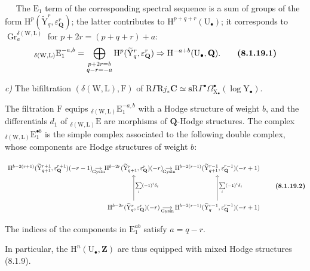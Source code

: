 \documentclass[11pt,leqno]{article}
\newcommand{\Page}[1]{\ifvmode\noindent\else\unskip\ \fi{\footnotesize\textcolor{gray}{[p.\,#1]}}\ \ignorespaces}
\begin{document}
\Page{35}
The \(\mathrm{E}_{1}\) term of the corresponding spectral sequence is a sum of groups of the form \(\mathrm{H}^{p}(\widetilde{\mathrm{Y}}_{q}^{r},\varepsilon_{\mathbf{Q}}^{r})\); the latter contributes to \(\mathrm{H}^{p+q+r}(\mathrm{U}_{\bullet})\); it corresponds to \(\operatorname{Gr}_{a}^{\delta(\mathrm{W},\mathrm{L})}\) for \(p+2r=(p+q+r)+a\):
\[
{}_{\delta(\mathrm{W},\mathrm{L})}\mathrm{E}_{1}^{-a,b}
=
\bigoplus_{\substack{p+2r=b\\q-r=-a}}
\mathrm{H}^{p}(\widetilde{\mathrm{Y}}_{q}^{r},\varepsilon_{\mathbf{Q}}^{r})
\Rightarrow
\mathrm{H}^{-a+b}(\mathrm{U}_{\bullet},\mathbf{Q}).
\tag*{\textbf{(8.1.19.1)}}
\]

\textit{c)} The bifiltration \((\delta(\mathrm{W},\mathrm{L}),\mathrm{F})\) of \(\mathrm{R}\Gamma\mathrm{R}j_{\ast}\mathbf{C}\simeq\mathbf{s}\mathrm{R}\Gamma^\bullet\Omega_{\mathrm{X}_{\bullet}}^\bullet(\log\mathrm{Y}_{\bullet})\).

The filtration \(\mathrm{F}\) equips \({}_{\delta(\mathrm{W},\mathrm{L})}\mathrm{E}_{1}^{-a,b}\) with a Hodge structure of weight \(b\), and the differentials \(d_{1}\) of \({}_{\delta(\mathrm{W},\mathrm{L})}\mathrm{E}\) are morphisms of \(\mathbf{Q}\)-Hodge structures. The complex \({}_{\delta(\mathrm{W},\mathrm{L})}\mathrm{E}_{1}^{\bullet b}\) is the simple complex associated to the following double complex, whose components are Hodge structures of weight \(b\):

{\small
\[
\begin{tikzcd}[ampersand replacement=\&, column sep=1em, row sep=4em]
\mathrm{H}^{b-2(r+1)}
(\widetilde{\mathrm{Y}}_{q+1}^{r+1},\varepsilon_{\mathbf{Q}}^{r+1})(-r-1)
\arrow[r, "\mathrm{Gysin}"']
\&
\mathrm{H}^{b-2r}
(\widetilde{\mathrm{Y}}_{q+1}^{r},\varepsilon_{\mathbf{Q}}^{r})(-r)
\arrow[r, "\mathrm{Gysin}"']
\&
\mathrm{H}^{b-2(r-1)}
(\widetilde{\mathrm{Y}}_{q+1}^{r-1},\varepsilon_{\mathbf{Q}}^{r-1})(-r+1)
\\
\&
\mathrm{H}^{b-2r}
(\widetilde{\mathrm{Y}}_{q}^{r},\varepsilon_{\mathbf{Q}}^{r})(-r)
\arrow[u, "{\sum\limits_i(-1)^i\delta_i}"']
\arrow[r, "\mathrm{Gysin}"']
\&
\mathrm{H}^{b-2(r-1)}
(\widetilde{\mathrm{Y}}_{q}^{r-1},\varepsilon_{\mathbf{Q}}^{r-1})(-r+1)
\arrow[u, "{\sum\limits_i(-1)^i\delta_i}"']
\end{tikzcd}
\tag*{\textbf{(8.1.19.2)}}
\]
}


The indices of the components in \(\mathrm{E}_{1}^{ab}\) satisfy \(a=q-r\).

In particular, the \(\mathrm{H}^{n}(\mathrm{U}_{\bullet},\mathbf{Z})\) are thus equipped with mixed Hodge structures (8.1.9).
\end{document}
